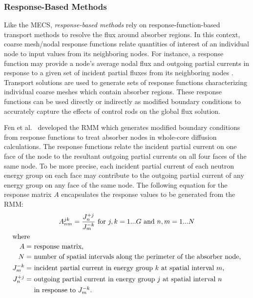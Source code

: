 \subsubsection{Response-Based Methods}

Like the \gls{MECS}, \textit{response-based methods} rely on response-function-based
transport methods to resolve the flux around absorber regions. In this context, coarse mesh/nodal
response functions relate quantities of interest of an individual node to input values from its
neighboring nodes. For instance, a response function may provide a node's average nodal flux and
outgoing partial currents in response to a given set of incident
partial fluxes from its neighboring nodes \cite{ougouag_transport_2010}. Transport solutions are
used to generate sets of response functions characterizing individual coarse meshes which contain
absorber regions. These response functions can be used directly or indirectly as modified boundary
conditions to accurately capture the effects of control rods on the global flux solution.

Fen et al.\ \cite{fen_modelling_1992} developed the \gls{RMM} which generates modified boundary
conditions from response functions to treat absorber nodes in whole-core diffusion calculations.
The response functions relate the incident partial current on one face of the node to the resultant
outgoing partial currents on all four faces of the same node. To be more precise, each incident
partial current of each neutron energy group on each face may contribute to the outgoing partial
current of any energy group on any face of the same node. The following equation for the response
matrix $A$ encapsulates the response values to be generated from the \gls{RMM}:
%
\begin{gather}
  A^{jk}_{nm} = \frac{J^{+j}_n}{J^{-k}_m} \mbox{ for } j,k=1...G \mbox{ and } n,m=1...N
  \label{eq:rmm} \\
  \shortintertext{where}
  \begin{align}
    A =& \mbox{ response matrix,} \nonumber \\
    N =& \mbox{ number of spatial intervals along the perimeter of the absorber node,} \nonumber \\
    J^{-k}_m =& \mbox{ incident partial current in energy group $k$ at spatial interval $m$,}
      \nonumber \\
    J^{+j}_n =& \mbox{ outgoing partial current in energy group $j$ at spatial interval $n$}
      \nonumber \\
    &\mbox{ in response to $J^{-k}_m$.} \nonumber
  \end{align}
\end{gather}

